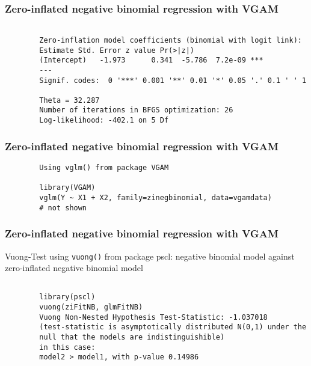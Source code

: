 \documentclass{beamer}
\begin{document}
	\begin{frame}[fragile]
		\frametitle{Zero-inflated negative binomial regression with VGAM}
		\begin{verbatim}
		
		Zero-inflation model coefficients (binomial with logit link):
		Estimate Std. Error z value Pr(>|z|)    
		(Intercept)   -1.973      0.341  -5.786  7.2e-09 ***
		---
		Signif. codes:  0 '***' 0.001 '**' 0.01 '*' 0.05 '.' 0.1 ' ' 1 
		
		Theta = 32.287 
		Number of iterations in BFGS optimization: 26 
		Log-likelihood: -402.1 on 5 Df
		\end{verbatim}
	\end{frame}
	\begin{frame}[fragile]
		\frametitle{Zero-inflated negative binomial regression with VGAM}
		\begin{verbatim}
		Using vglm() from package VGAM
		
		library(VGAM)
		vglm(Y ~ X1 + X2, family=zinegbinomial, data=vgamdata)
		# not shown
		\end{verbatim}
		
		
		
	\end{frame}
	\begin{frame}[fragile]
		\frametitle{Zero-inflated negative binomial regression with VGAM}
		Vuong-Test using \texttt{vuong()} from package pscl: negative binomial model against zero-inflated negative binomial model
		\begin{verbatim}
		
		library(pscl)
		vuong(ziFitNB, glmFitNB)
		Vuong Non-Nested Hypothesis Test-Statistic: -1.037018 
		(test-statistic is asymptotically distributed N(0,1) under the
		null that the models are indistinguishible)
		in this case:
		model2 > model1, with p-value 0.14986 
		\end{verbatim}
	\end{frame}
\end{document}
